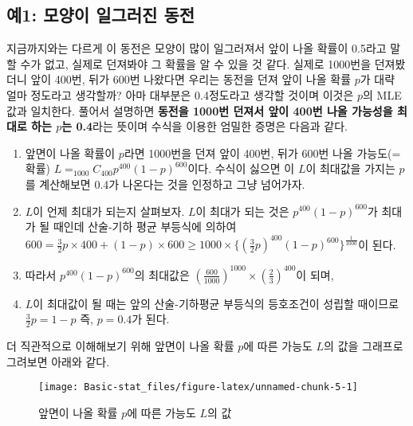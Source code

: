 \documentclass[]{book}
\providecommand{\tightlist}{%
  \setlength{\itemsep}{0pt}\setlength{\parskip}{0pt}}
\begin{document}
\subsection{예1: 모양이 일그러진
동전}\label{uxc6081-uxbaa8uxc591uxc774-uxc77cuxadf8uxb7ecuxc9c4-uxb3d9uxc804}

지금까지와는 다르게 이 동전은 모양이 많이 일그러져서 앞이 나올 확률이
0.5라고 말할 수가 없고, 실제로 던져봐야 그 확률을 알 수 있을 것 같다.
실제로 1000번을 던져봤더니 앞이 400번, 뒤가 600번 나왔다면 우리는 동전을
던져 앞이 나올 확률 \(p\)가 대략 얼마 정도라고 생각할까? 아마 대부분은
0.4정도라고 생각할 것이며 이것은 \(p\)의 MLE값과 일치한다. 풀어서
설명하면 \textbf{동전을 1000번 던져서 앞이 400번 나올 가능성을 최대로
하는 \(p\)는 0.4}라는 뜻이며 수식을 이용한 엄밀한 증명은 다음과 같다.

\begin{enumerate}
\def\labelenumi{\arabic{enumi}.}
\tightlist
\item
  앞면이 나올 확률이 \(p\)라면 1000번을 던져 앞이 400번, 뒤가 600번 나올
  가능도(=확률) \(L=_{1000} C_{400}p^{400}(1-p)^{600}\)이다. 수식이
  싫으면 이 \(L\)이 최대값을 가지는 \(p\)를 계산해보면 0.4가 나온다는
  것을 인정하고 그냥 넘어가자.
\item
  \(L\)이 언제 최대가 되는지 살펴보자. \(L\)이 최대가 되는 것은
  \(p^{400}(1-p)^{600}\)가 최대가 될 때인데 산술-기하 평균 부등식에
  의하여
  \(600= \frac{3}{2}p\times 400 + (1-p)\times 600 \ge 1000\times \{(\frac{3}{2}p)^{400}(1-p)^{600}\}^{\frac{1}{1000}}\)이
  된다.\\
\item
  따라서 \(p^{400}(1-p)^{600}\)의 최대값은
  \((\frac{600}{1000})^{1000} \times (\frac{2}{3})^{400}\)이 되며,
\item
  \(L\)이 최대값이 될 때는 앞의 산술-기하평균 부등식의 등호조건이 성립할
  때이므로 \(\frac{3}{2}p=1-p\) 즉, \(p=0.4\)가 된다.
\end{enumerate}

더 직관적으로 이해해보기 위해 앞면이 나올 확률 \(p\)에 따른 가능도
\(L\)의 값을 그래프로 그려보면 아래와 같다.

\begin{figure}

{\centering \texttt{[image: Basic-stat\_files/figure-latex/unnamed-chunk-5-1]} 

}

\caption{앞면이 나올 확률 $p$에 따른 가능도 $L$의 값}\label{fig:unnamed-chunk-5}
\end{figure}
\end{document}

